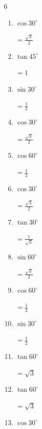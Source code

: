 \begin{multicols}{6}
\begin{enumerate}
        $\displaystyle =\frac{1}{\sqrt{3}}$

  \item $\displaystyle \cos{30^\circ}$

        $\displaystyle =\frac{\sqrt{3}}{2}$

  \item $\displaystyle \tan{45^\circ}$

        $\displaystyle =1$

\columnbreak %

  \item $\displaystyle \sin{30^\circ}$

        $\displaystyle =\frac{1}{2}$

  \item $\displaystyle \cos{30^\circ}$

        $\displaystyle =\frac{\sqrt{3}}{2}$

  \item $\displaystyle \cos{60^\circ}$

        $\displaystyle =\frac{1}{2}$

  \item $\displaystyle \cos{30^\circ}$

        $\displaystyle =\frac{\sqrt{3}}{2}$

  \item $\displaystyle \tan{30^\circ}$

        $\displaystyle =\frac{1}{\sqrt{3}}$

  \item $\displaystyle \sin{60^\circ}$

        $\displaystyle =\frac{\sqrt{3}}{2}$

  \item $\displaystyle \cos{60^\circ}$

        $\displaystyle =\frac{1}{2}$

  \item $\displaystyle \sin{30^\circ}$

        $\displaystyle =\frac{1}{2}$

  \item $\displaystyle \tan{60^\circ}$

        $\displaystyle =\sqrt{3}$

  \item $\displaystyle \tan{60^\circ}$

        $\displaystyle =\sqrt{3}$

  \item $\displaystyle \cos{30^\circ}$


\end{enumerate}
\end{multicols}
